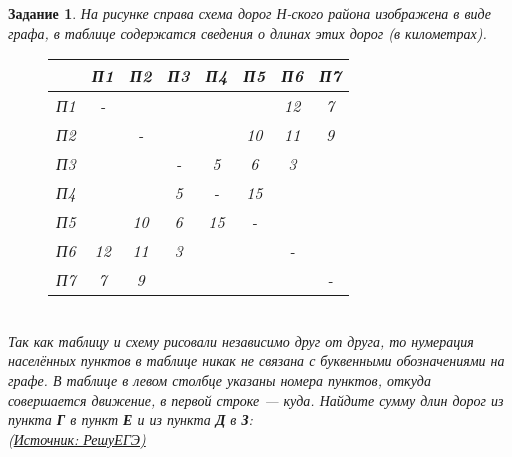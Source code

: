 \documentclass[12pt]{article}
\theoremstyle{problem_style}
\newtheorem{problem}{Задание}[subsection]
\begin{document}
\begin{problem}
На рисунке справа схема дорог Н-ского района изображена в виде графа, в таблице содержатся сведения о длинах этих дорог (в километрах). 
\begin{figure}[h]
    \centering
    \begin{minipage}[t!]{0.45\textwidth}
        \centering
        \begin{tabular}{|c|c|c|c|c|c|c|c|}\hline
        & П1 & П2 & П3 & П4 & П5 & П6 & П7 \\ \hline
        П1 & - & & & & & 12 & 7 \\ \hline
        П2 & & - & & & 10 & 11 & 9 \\ \hline
        П3 & & & - & 5 & 6 & 3 & \\ \hline
        П4 & & & 5 & - & 15 & & \\ \hline
        П5 & & 10 & 6 & 15 & - & & \\ \hline
        П6 & 12 & 11 & 3 & & & - & \\ \hline
        П7 & 7 & 9 & & & & & - \\ \hline
        \end{tabular}
    \end{minipage}
    \hfill
    \begin{minipage}[t!]{0.45\textwidth}
        \centering
    \end{minipage}
\end{figure}\\
Так как таблицу и схему рисовали независимо друг от друга, то нумерация населённых пунктов в таблице никак не связана с буквенными обозначениями на графе. В таблице в левом столбце указаны номера пунктов, откуда совершается движение, в первой строке — куда. Найдите сумму длин дорог из пункта \textbf{Г} в пункт \textbf{Е} и из пункта \textbf{Д} в \textbf{З}:\\
(\href{https://inf-ege.sdamgia.ru/}{Источник: РешуЕГЭ)} %
\end{problem}
\end{document}
